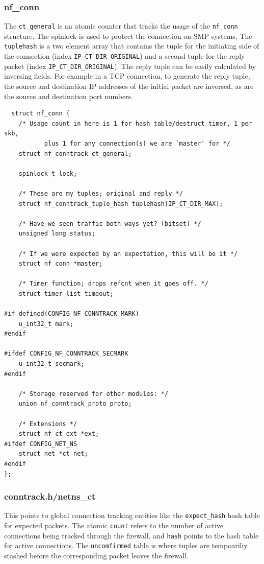 \documentclass[a4paper,10pt]{article}
\newcommand{\code}[1]{\texttt{{#1}}}
\begin{document}
\subsubsection{nf\_conn}\label{nf_conn}

The \code{ct\_general} is an atomic counter that tracks the usage of
the \code{nf\_conn} structure. The spinlock is used to protect the
connection on SMP systems. The \verb|tuplehash| is a two element array
that contains the tuple for the initiating side of the connection
(index \verb|IP_CT_DIR_ORIGINAL|) and a second tuple for the
reply packet (index \verb|IP_CT_DIR_ORIGINAL|). The reply tuple
can be easily calculated by inversing fields. For example in a TCP
connection, to generate the reply tuple, the source and destination IP
addresses of the initial packet are inversed, as are the source and
destination port numbers.

\begin{lstlisting}
  struct nf_conn {
	/* Usage count in here is 1 for hash table/destruct timer, 1 per skb,
           plus 1 for any connection(s) we are `master' for */
	struct nf_conntrack ct_general;

	spinlock_t lock;

	/* These are my tuples; original and reply */
	struct nf_conntrack_tuple_hash tuplehash[IP_CT_DIR_MAX];

	/* Have we seen traffic both ways yet? (bitset) */
	unsigned long status;

	/* If we were expected by an expectation, this will be it */
	struct nf_conn *master;

	/* Timer function; drops refcnt when it goes off. */
	struct timer_list timeout;

#if defined(CONFIG_NF_CONNTRACK_MARK)
	u_int32_t mark;
#endif

#ifdef CONFIG_NF_CONNTRACK_SECMARK
	u_int32_t secmark;
#endif

	/* Storage reserved for other modules: */
	union nf_conntrack_proto proto;

	/* Extensions */
	struct nf_ct_ext *ext;
#ifdef CONFIG_NET_NS
	struct net *ct_net;
#endif
};
\end{lstlisting}

\subsubsection{conntrack.h/netns\_ct}

This points to global connection tracking entities like the
\verb|expect_hash| hash table for expected packets. The atomic
\verb|count| refers to the number of active connections being tracked
through the firewall, and \verb|hash| points to the hash table for
active connections. The \verb|uncomfirmed| table is where tuples are
tempoariliy stashed before the corresponding packet leaves the
firewall.
\end{document}
